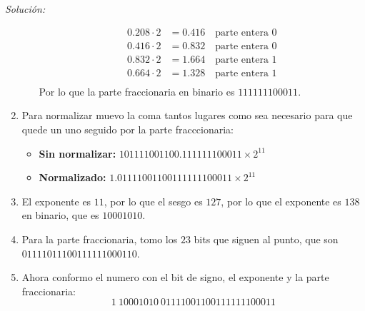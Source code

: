 \documentclass{article}
\newenvironment{solution}
    {\textit{Solución:}}
    {}
\begin{document}
\begin{solution}
\begin{enumerate}
\begin{itemize}
\begin{align*}
            0.208 \cdot 2 &= 0.416 \quad \text{parte entera } 0\\
            0.416 \cdot 2 &= 0.832 \quad \text{parte entera } 0\\
            0.832 \cdot 2 &= 1.664 \quad \text{parte entera } 1\\
            0.664 \cdot 2 &= 1.328 \quad \text{parte entera } 1\\
        \end{align*}
        Por lo que la parte fraccionaria en binario es $111111100011$.
    \end{itemize}
    \item Para normalizar muevo la coma tantos lugares como sea necesario para que quede un uno seguido por la parte fracccionaria:
        \begin{itemize}
            \item \textbf{Sin normalizar:} $101111001100.111111100011 \times 2^{11}$
            \item \textbf{Normalizado:} $1.01111001100111111100011 \times 2^{11}$
        \end{itemize}
    \item El exponente es $11$, por lo que el sesgo es $127$, por lo que el exponente es $138$ en binario, que es $10001010$.
    \item Para la parte fraccionaria, tomo los $23$ bits que siguen al punto, que son $01111011100111111000110$.
    \item Ahora conformo el numero con el bit de signo, el exponente y la parte fraccionaria:
    \begin{equation*}
        1 \ 10001010 \ 01111001100111111100011
    \end{equation*}
\end{enumerate}


\end{solution}
\end{document}
